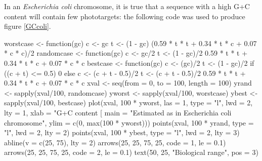 \documentclass{article}
\begin{document}
In an \textit{Escherichia coli} chromosome, it is true that a sequence
with a high G+C content will contain few phototargets: the following
code was used to produce figure \ref{GCcoli}.

\begin{Schunk}
\begin{Sinput}
 worstcase <- function(gc) {
     c <- gc
     t <- (1 - gc)
     (0.59 * t * t + 0.34 * t * c + 0.07 * c * c)/2
 }
 randomcase <- function(gc) {
     c <- gc/2
     t <- (1 - gc)/2
     0.59 * t * t + 0.34 * t * c + 0.07 * c * c
 }
 bestcase <- function(gc) {
     c <- (gc)/2
     t <- (1 - gc)/2
     if ((c + t) <= 0.5) {
         0
     }
     else {
         c <- (c + t - 0.5)/2
         t <- (c + t - 0.5)/2
         0.59 * t * t + 0.34 * t * c + 0.07 * c * c
     }
 }
 xval <- seq(from = 0, to = 100, length = 100)
 yrand <- sapply(xval/100, randomcase)
 yworst <- sapply(xval/100, worstcase)
 ybest <- sapply(xval/100, bestcase)
 plot(xval, 100 * yworst, las = 1, type = "l", lwd = 2, lty = 1, 
     xlab = "G+C content [%
     main = "Estimated as in Escherichia coli chromosome", 
     ylim = c(0, max(100 * yworst)))
 points(xval, 100 * yrand, type = "l", lwd = 2, lty = 2)
 points(xval, 100 * ybest, type = "l", lwd = 2, lty = 3)
 abline(v = c(25, 75), lty = 2)
 arrows(25, 25, 75, 25, code = 1, le = 0.1)
 arrows(25, 25, 75, 25, code = 2, le = 0.1)
 text(50, 25, "Biological range", pos = 3)
\end{Sinput}
\end{Schunk}

\begin{figure}
\centering{}
\end{figure}
\end{document}
